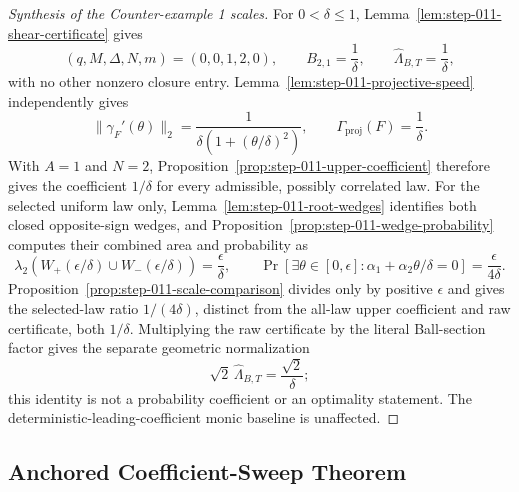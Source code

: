 \begin{proof}[Synthesis of the Counter-example 1 scales]
For $0<\delta\leq1$, Lemma~\ref{lem:step-011-shear-certificate} gives
\begin{equation}
\label{eq:appendix-display-369}
(q,M,\Delta,N,m)=(0,0,1,2,0),
\qquad B_{2,1}=\frac1\delta,
\qquad \widehat\Lambda_{B,T}=\frac1\delta,
\end{equation}
with no other nonzero closure entry.  Lemma~\ref{lem:step-011-projective-speed}
independently gives
\begin{equation}
\label{eq:appendix-display-370}
\|\gamma_F'(\theta)\|_2
=\frac1{\delta(1+(\theta/\delta)^2)},
\qquad
\Gamma_{\mathrm{proj}}(F)=\frac1\delta.
\end{equation}
With $A=1$ and $N=2$, Proposition~\ref{prop:step-011-upper-coefficient}
therefore gives the coefficient $1/\delta$ for every admissible, possibly
correlated law.  For the selected uniform law only,
Lemma~\ref{lem:step-011-root-wedges} identifies both closed opposite-sign
wedges, and Proposition~\ref{prop:step-011-wedge-probability} computes their
combined area and probability as
\begin{equation}
\label{eq:appendix-display-371}
\lambda_2(W_+(\epsilon/\delta)\cup W_-(\epsilon/\delta))
=\frac\epsilon\delta,
\qquad
\Pr[\exists\theta\in[0,\epsilon]:
\alpha_1+\alpha_2\theta/\delta=0]
=\frac{\epsilon}{4\delta}.
\end{equation}
Proposition~\ref{prop:step-011-scale-comparison} divides only by positive
$\epsilon$ and gives the selected-law ratio $1/(4\delta)$, distinct from
the all-law upper coefficient and raw certificate, both $1/\delta$.
Multiplying the raw certificate by the literal Ball-section factor gives the
separate geometric normalization
\begin{equation}
\label{eq:appendix-display-372}
\sqrt2\,\widehat\Lambda_{B,T}=\frac{\sqrt2}{\delta};
\end{equation}
this identity is not a probability coefficient or an optimality statement.
The deterministic-leading-coefficient monic baseline is unaffected.
\end{proof}

\subsection{Anchored Coefficient-Sweep Theorem}\label{app:step-012}

